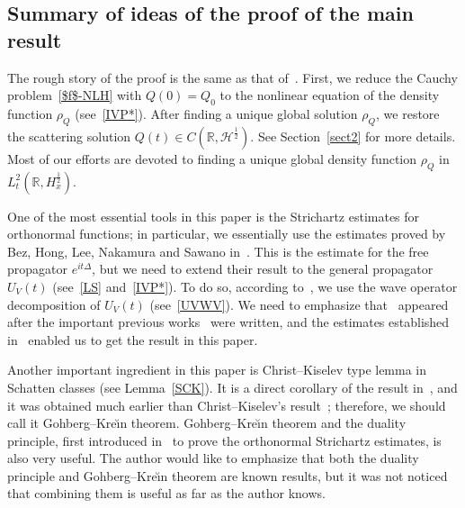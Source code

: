\documentclass[AHL,Unicode,longabstracts,MathTools,published]{cedram}
\newcommand{\BR}{\mathbb{R}}
\newcommand{\CH}{\mathcal{H}}
\newcommand{\rh}{\rho}
\newcommand{\De}{\Delta}
\newcommand{\R}{\mathbb{R}}
\newcommand{\tw}{\frac{1}{2}}
\begin{document}
\subsection{Summary of ideas of the proof of the main result} 

The rough story of the proof is the same as that of~\cite{2018CHP,2014LS}. First, we reduce the Cauchy problem~\eqref{$f$-NLH} with $Q(0)=Q_0$ to the nonlinear equation of the density function $\rh_Q$ (see~\eqref{IVP*}). After finding a unique global solution $\rh_Q$, we restore the scattering solution $Q(t) \in C(\BR,\CH^\tw)$. See Section~\ref{sect2} for more details. Most of our efforts are devoted to finding a unique global density function $\rh_Q$ in $L^2_t(\R,H^\tw_x)$.

One of the most essential tools in this paper is the Strichartz estimates for orthonormal functions; in particular, we essentially use the estimates proved by Bez, Hong, Lee, Nakamura and Sawano in~\cite{2019BHLNS}. This is the estimate for the free propagator $e^{it\De}$, but we need to extend their result to the general propagator $U_V(t)$ (see~\eqref{LS} and~\eqref{IVP*}). To do so, according to~\cite{2018CHP,2014LS}, we use the wave operator decomposition of $U_V(t)$ (see~\eqref{UVWV}). We need to emphasize that~\cite{2019BHLNS} appeared after the important previous works~\cite{2018CHP,2014LS} were written, and the estimates established in~\cite{2019BHLNS} enabled us to get the result in this paper.

Another important ingredient in this paper is Christ--Kiselev type lemma in Schatten classes (see Lemma~\ref{SCK}). It is a direct corollary of the result in~\cite{1970Go-Kre}, and it was obtained much earlier than Christ--Kiselev's result~\cite{2001CK}; therefore, we should call it Gohberg--Kre\u{\i}n theorem. Gohberg--Kre\u{\i}n theorem and the duality principle, first introduced in~\cite{2017FS} to prove the orthonormal Strichartz estimates, is also very useful. The author would like to emphasize that both the duality principle and Gohberg--Kre\u{\i}n theorem are known results, but it was not noticed that combining them is useful as far as the author knows.
\end{document}
